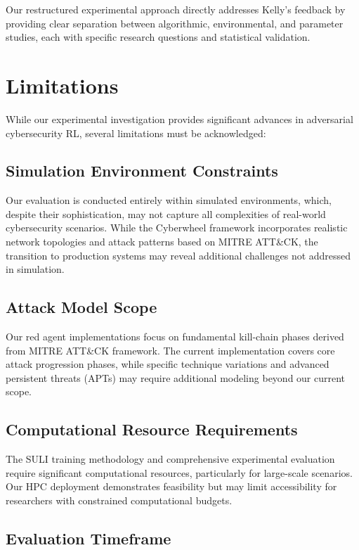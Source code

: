 \documentclass[12pt,twoside]{article}
\begin{document}
Our restructured experimental approach directly addresses Kelly's feedback by providing clear separation between algorithmic, environmental, and parameter studies, each with specific research questions and statistical validation.

\section{Limitations}

While our experimental investigation provides significant advances in adversarial cybersecurity RL, several limitations must be acknowledged:

\subsection{Simulation Environment Constraints}

Our evaluation is conducted entirely within simulated environments, which, despite their sophistication, may not capture all complexities of real-world cybersecurity scenarios. While the Cyberwheel framework incorporates realistic network topologies and attack patterns based on MITRE ATT\&CK, the transition to production systems may reveal additional challenges not addressed in simulation.

\subsection{Attack Model Scope}

Our red agent implementations focus on fundamental kill-chain phases derived from MITRE ATT\&CK framework. The current implementation covers core attack progression phases, while specific technique variations and advanced persistent threats (APTs) may require additional modeling beyond our current scope.

\subsection{Computational Resource Requirements}

The SULI training methodology and comprehensive experimental evaluation require significant computational resources, particularly for large-scale scenarios. Our HPC deployment demonstrates feasibility but may limit accessibility for researchers with constrained computational budgets.

\subsection{Evaluation Timeframe}
\end{document}

